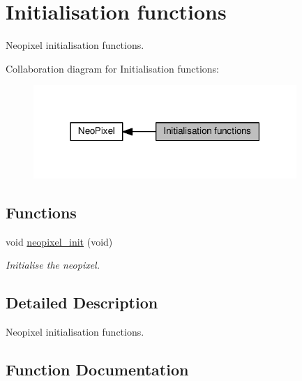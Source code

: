 \hypertarget{group___neo_pixel___init}{}\section{Initialisation functions}
\label{group___neo_pixel___init}


Neopixel initialisation functions.  


Collaboration diagram for Initialisation functions\+:\nopagebreak
\begin{figure}[H]
\begin{center}
\leavevmode
\includegraphics[width=283pt]{d2/de6/group___neo_pixel___init}
\end{center}
\end{figure}
\subsection*{Functions}
\begin{DoxyCompactItemize}
\item 
void \hyperlink{group___neo_pixel___init_gaac78468985e44a3e4d353ea9276b33bc}{neopixel\+\_\+init} (void)
\begin{DoxyCompactList}\small\item\em Initialise the neopixel. \end{DoxyCompactList}\end{DoxyCompactItemize}


\subsection{Detailed Description}
Neopixel initialisation functions. 



\subsection{Function Documentation}
